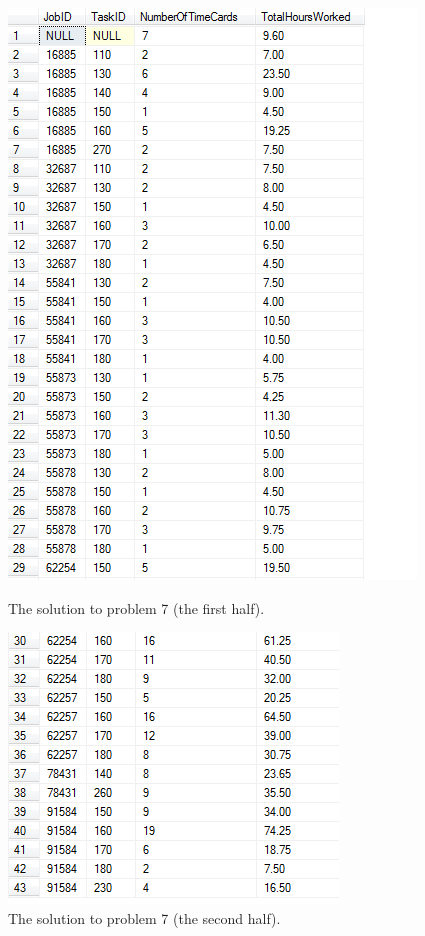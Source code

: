 \documentclass{article}
\begin{document}
\begin{enumerate}
  \begin{figure}[h!]
    \centering
    \begin{minipage}{.5\textwidth}
      \centering
      \includegraphics[width=.8\linewidth]{QueryResults/HW04_Problem07a_query}
      \caption{The solution to problem 7 (the first half).}
      \label{fig:HW04_Problem07a}
    \end{minipage}%
    \begin{minipage}{.5\textwidth}
      \centering
      \includegraphics[width=.7\linewidth]{QueryResults/HW04_Problem07b_query}
      \caption{The solution to problem 7 (the second half).}
      \label{fig:HW04_Problem07b}
    \end{minipage}
  \end{figure}


\end{enumerate}
\end{document}
